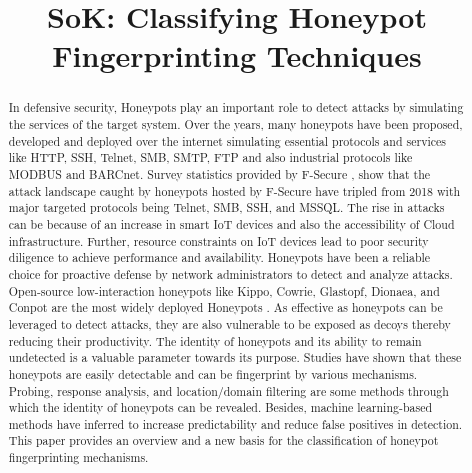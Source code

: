\documentclass[letterpaper, 10 pt, conference]{ieeeconf}  %
\title{\LARGE \bf
SoK: Classifying Honeypot Fingerprinting Techniques
}
\begin{document}
\maketitle
\thispagestyle{empty}
\pagestyle{empty}
\begin{abstract}
In defensive security, Honeypots play an important role to detect attacks by simulating the services of the target system. Over the years, many honeypots have been proposed, developed and deployed over the internet simulating essential protocols and services like HTTP, SSH, Telnet, SMB, SMTP, FTP and also industrial protocols like MODBUS and BARCnet. Survey statistics provided by F-Secure \cite{F-Secure}, show that the attack landscape caught by honeypots hosted by F-Secure have tripled from 2018 with major targeted protocols being Telnet, SMB, SSH, and  MSSQL. The rise in attacks can be because of an increase in smart IoT devices and also the accessibility of Cloud infrastructure. Further, resource constraints on IoT devices lead to poor security diligence to achieve performance and availability. Honeypots have been a reliable choice for proactive defense by network administrators to detect and analyze attacks. Open-source low-interaction honeypots like Kippo, Cowrie, Glastopf, Dionaea, and Conpot are the most widely deployed Honeypots \cite{Vetterl2018}. As effective as honeypots can be leveraged to detect attacks, they are also vulnerable to be exposed as decoys thereby reducing their productivity. The identity of honeypots and its ability to remain undetected is a valuable parameter towards its purpose. Studies have shown that these honeypots are easily detectable and can be fingerprint by various mechanisms. Probing, response analysis, and location/domain filtering are some methods through which the identity of honeypots can be revealed. Besides, machine learning-based methods have inferred to increase predictability and reduce false positives in detection. This paper provides an overview and a new basis for the classification of honeypot fingerprinting mechanisms. 
\end{abstract}




\end{document}
